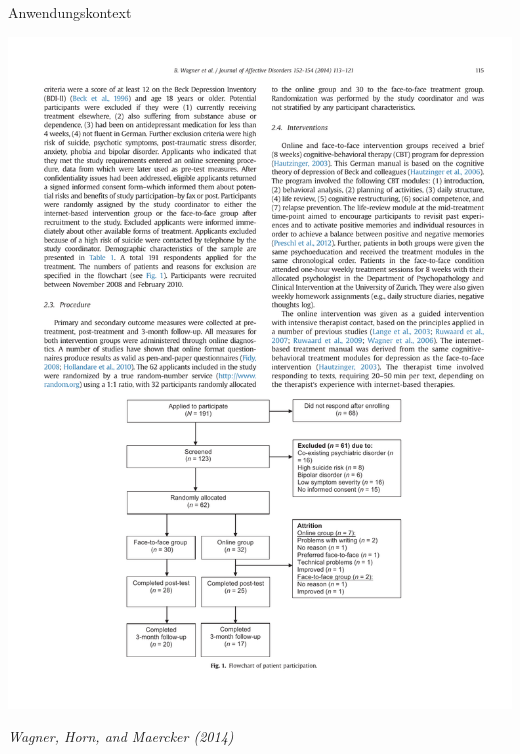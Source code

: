 \documentclass[
  8pt,
  ignorenonframetext,
]{beamer}
\begin{document}
\begin{frame}[t]{Anwendungskontext}
\begin{center}\includegraphics[width=0.49\linewidth]{8_Abbildungen/alm_8_article_procedure_2} \end{center}
\vfill
\flushright
\footnotesize

\emph{Wagner, Horn, and Maercker (2014)}
\end{frame}
\end{document}
